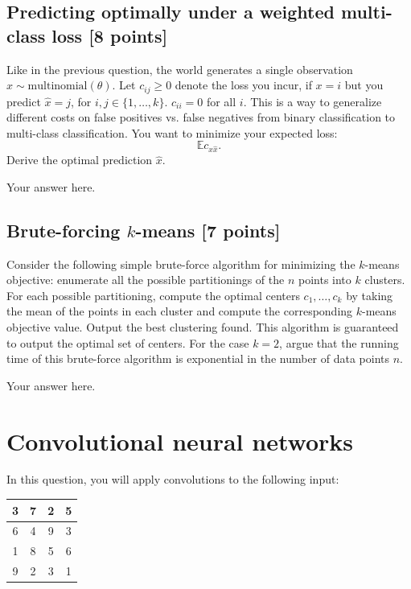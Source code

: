 \documentclass[a4paper]{article}
\theoremstyle{definition}
\def\E{\mathbb E}
\begin{document}
\subsection{Predicting optimally under a weighted multi-class loss [8 points]}

Like in the previous question, 
the world generates a single observation $x \sim \mbox{multinomial}(\theta)$.
Let $c_{ij} \ge 0$ denote the loss you incur, if $x=i$ but you predict $\hat x=j$, for $i,j \in \{1, \ldots, k\}$.
$c_{ii}=0$ for all $i$.
This is a way to generalize different costs on false positives vs. false negatives from binary classification to multi-class classification.
You want to minimize your expected loss:
$$\E c_{x \hat x}.$$
Derive the optimal prediction $\hat x$.

{\color{blue} Your answer here.}

\subsection{Brute-forcing $k$-means [7 points]}

Consider the following simple brute-force algorithm for minimizing the $k$-means
objective: enumerate all the possible partitionings of the $n$ points into $k$
clusters. For each possible partitioning, compute the optimal centers $c_1,\dots,c_k$ by taking the mean of the points in each cluster and compute the
corresponding $k$-means objective value. Output the best clustering found. This
algorithm is guaranteed to output the optimal set of centers.
For the case $k = 2$, argue that the running time of this brute-force algorithm is exponential in the number of data points $n$.
	
{\color{blue} Your answer here.}

\newpage
\section{Convolutional neural networks}

In this question, you will apply convolutions to the following input:

\begin{tabular}{|c|c|c|c|}
	\hline
	3 & 7 & 2 & 5 \\
	\hline
	6 & 4 & 9 & 3 \\
	\hline
	1 & 8 & 5 & 6 \\
	\hline
	9 & 2 & 3 & 1 \\
	\hline
\end{tabular}
\end{document}
